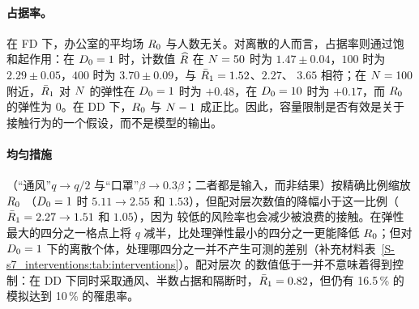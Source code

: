 \paragraph{占据率。}在 FD 下，办公室的平均场 $R_0$ 与人数无关。对离散的人而言，占据率则通过饱和起作用：在 $D_0=1$ 时，计数值
$\widehat{R}$ 在 $N=50$ 时为 $1.47\pm0.04$，$100$ 时为 $2.29\pm0.05$，$400$ 时为 $3.70\pm0.09$，与 $\bar{R}_1=1.52$、$2.27$、
$3.65$ 相符；在 $N=100$ 附近，$\bar{R}_1$ 对 $N$ 的弹性在 $D_0=1$ 时为 $+0.48$，在 $D_0=10$ 时为 $+0.17$，而 $R_0$
的弹性为 $0$。在 DD 下，$R_0$ 与 $N-1$ 成正比。因此，容量限制是否有效是关于接触行为的一个假设，而不是模型的输出。

\paragraph{均匀措施}（“通风”$q\to q/2$ 与“口罩”$\beta\to0.3\beta$；二者都是输入，而非结果）按精确比例缩放 $R_0$
（$D_0=1$ 时 $5.11\to2.55$ 和 $1.53$），但配对层次数值的降幅小于这一比例（$\bar{R}_1=2.27\to1.51$ 和 $1.05$），因为
较低的风险率也会减少被浪费的接触。在弹性最大的四分之一格点上将 $q$ 减半，比处理弹性最小的四分之一更能降低 $R_0$；但对
$D_0=1$ 下的离散个体，处理哪四分之一并不产生可测的差别（补充材料表~\ref{S-s7_interventions:tab:interventions}）。配对层次
的数值低于一并不意味着得到控制：在 DD 下同时采取通风、半数占据和隔断时，$\bar{R}_1=0.82$，但仍有 16.5\,\% 的模拟达到
10\,\% 的罹患率。

